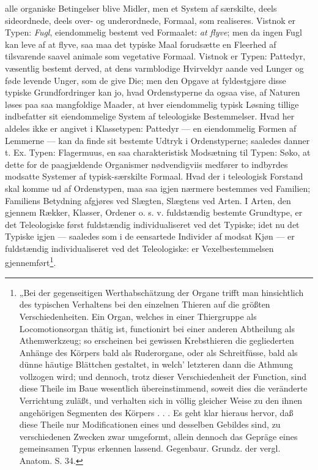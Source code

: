 \documentclass[12pt,a4paper]{book}
\begin{document}
\setcounter{footnote}{0}
alle organiske Betingelser blive Midler, men et System af særskilte, deels
sideordnede, deels over- og underordnede, Formaal, som realiseres. Vistnok er
Typen: \emph{Fugl}, eiendommelig bestemt ved Formaalet: \emph{at flyve}; men da
ingen Fugl kan leve af at flyve, saa maa det typiske Maal forudsætte en Fleerhed
af tilsvarende saavel animale som vegetative Formaal. Vistnok er Typen:
Pattedyr, væsentlig bestemt derved, at dens varmblodige Hvirveldyr aande ved
Lunger og føde levende Unger, som de give Die; men den Opgave at fyldestgjøre
disse typiske Grundfordringer kan jo, hvad Ordenstyperne da ogsaa vise, af
Naturen løses paa saa mangfoldige Maader, at hver eiendommelig typisk Løsning
tillige indbefatter sit eiendommelige System af teleologiske Bestemmelser. Hvad
her aldeles ikke er angivet i Klassetypen: Pattedyr --- en eiendommelig Formen
af Lemmerne --- kan da finde sit bestemte Udtryk i Ordenstyperne; saaledes
danner t. Ex. Typen: Flagermuus, en saa charakteristisk Modsætning til Typen:
Søko, at dette for de paagjældende Organismer nødvendigviis medfører to
indbyrdes modsatte Systemer af typisk-særskilte Formaal. Hvad der i teleologisk
Forstand skal komme ud af Ordenstypen, maa saa igjen nærmere bestemmes ved
Familien; Familiens Betydning afgjøres ved Slægten, Slægtens ved Arten. I Arten,
den gjennem Rækker, Klasser, Ordener o. s. v. fuldstændig bestemte Grundtype, er
det Teleologiske først fuldstændig individualiseret ved det Typiske; idet nu det
Typiske igjen --- saaledes som i de eensartede Individer af modsat Kjøn --- er
fuldstændig individualiseret ved det Teleologiske: er Vexelbestemmelsen
gjennemført\footnote{„Bei der gegenseitigen Werthabschätzung der Organe trifft
man hinsichtlich des typischen Verhaltens bei den einzelnen Thieren auf die
größten Verschiedenheiten. Ein Organ, welches in einer Thiergruppe als
Locomotionsorgan thätig ist, functionirt bei einer anderen Abtheilung als
Athemwerkzeug; so erscheinen bei gewissen Krebsthieren die gegliederten Anhänge
des Körpers bald als Ruderorgane, oder als Schreitfüsse, bald als dünne häutige
Blättchen gestaltet, in welch' letzteren dann die Athmung vollzogen wird; und
dennoch, trotz dieser Verschiedenheit der Function, sind diese Theile im Baue
wesentlich übereinstimmend, soweit dies die veränderte Verrichtung zuläßt, und
verhalten sich in völlig gleicher Weise zu den ihnen angehörigen Segmenten des
Körpers . . . Es geht klar hieraus hervor, daß diese Theile nur Modificationen
eines und desselben Gebildes sind, zu verschiedenen Zwecken zwar umgeformt,
allein dennoch das Gepräge eines gemeinsamen Typus erkennen lassend. Gegenbaur.
Grundz. der vergl. Anatom. S. 34.
}.
\end{document}
